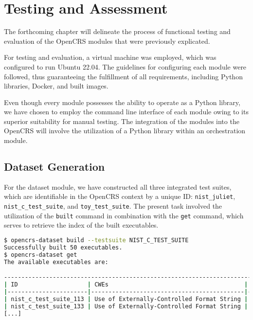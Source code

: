 \documentclass[../main.tex]{subfiles}
\begin{document}
\hypertarget{testing-and-assesment}{%
  \chapter{Testing and Assessment}\label{testing-and-assesment}}

The forthcoming chapter will delineate the process of functional testing and
evaluation of the OpenCRS modules that were previously explicated.

For testing and evaluation, a virtual machine was employed, which was
configured to run Ubuntu 22.04. The guidelines for configuring each module were
followed, thus guaranteeing the fulfillment of all requirements, including
Python libraries, Docker, and built images.

Even though every module possesses the ability to operate as a Python library,
we have chosen to employ the command line interface of each module owing to its
superior suitability for manual testing. The integration of the modules into
the OpenCRS will involve the utilization of a Python library within an
orchestration module.

\hypertarget{dataset-generation}{%
  \section{Dataset Generation}\label{dataset-generation}}

For the dataset module, we have constructed all three integrated test suites,
which are identifiable in the OpenCRS context by a unique ID:
\texttt{nist\_juliet}, \texttt{nist\_c\_test\_suite}, and
\texttt{toy\_test\_suite}. The present task involved the utilization of the
\texttt{built} command in combination with the \texttt{get} command, which
serves to retrieve the index of the built executables.

\begin{lstlisting}[captionpos=b,basicstyle=\tiny,language=Bash, caption=Example of Building and Retrieving a Dataset]
$ opencrs-dataset build --testsuite NIST_C_TEST_SUITE
Successfully built 50 executables.
$ opencrs-dataset get
The available executables are:

--------------------------------------------------------------------------------------------------------------
| ID                    | CWEs                                       | Full Path                             |
|-----------------------|--------------------------------------------|---------------------------------------|
| nist_c_test_suite_113 | Use of Externally-Controlled Format String | executables/nist_c_test_suite_113.elf |
| nist_c_test_suite_133 | Use of Externally-Controlled Format String | executables/nist_c_test_suite_133.elf |
[...]
\end{lstlisting}
\end{document}
